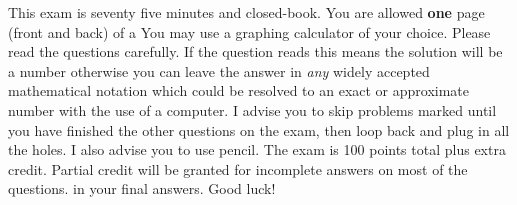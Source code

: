 \documentclass[12pt]{article}
\begin{document}
This exam is seventy five minutes and closed-book. You are allowed \textbf{one} page (front and back) of a  You may use a graphing calculator of your choice. Please read the questions carefully. If the question reads  this means the solution will be a number otherwise you can leave the answer in \textit{any} widely accepted mathematical notation which could be resolved to an exact or approximate number with the use of a computer. I advise you to skip problems marked  until you have finished the other questions on the exam, then loop back and plug in all the holes. I also advise you to use pencil. The exam is 100 points total plus extra credit. Partial credit will be granted for incomplete answers on most of the questions.  in your final answers. Good luck!

\pagebreak
\end{document}
